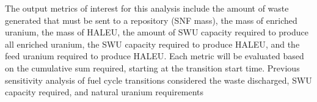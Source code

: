 The output metrics of 
interest for this analysis include the amount of waste generated that 
must be sent to a repository (\gls{SNF} mass), the mass of enriched uranium, 
the mass of \gls{HALEU},
the amount of \gls{SWU} capacity required to produce all enriched uranium, the 
\gls{SWU} capacity required to produce \gls{HALEU}, and the feed uranium 
required to produce \gls{HALEU}. Each metric will be evaluated based on the 
cumulative sum required, starting at the transition start time. Previous 
sensitivity analysis of fuel cycle transitions considered the waste 
discharged, \gls{SWU} 
capacity required, and natural uranium requirements
\cite{richards_application_2021,feng_sensitivity_2020} 







